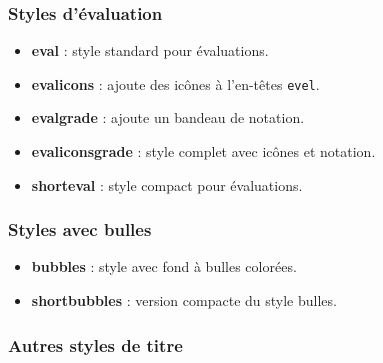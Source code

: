 \documentclass[
    french,
    margin=2cm
]{neoschool}
\begin{document}
\subsubsection{Styles d'évaluation}

\begin{itemize}

\item \textbf{eval} : style standard pour évaluations.
\end{itemize}


\begin{itemize}
\item \textbf{evalicons} : ajoute des icônes à l'en-têtes \texttt{evel}.
\item \textbf{evalgrade} : ajoute un bandeau de notation.
\item \textbf{evaliconsgrade} : style complet avec icônes et notation.
\item \textbf{shorteval} : style compact pour évaluations.
\end{itemize}

\subsubsection{Styles avec bulles}

\begin{itemize}
\item \textbf{bubbles} : style avec fond à bulles colorées.
\item \textbf{shortbubbles} : version compacte du style bulles.
\end{itemize}

\subsubsection{Autres styles de titre}
\end{document}
